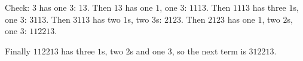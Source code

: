 Check: $3$ has one $3$: $13$. Then $13$ has one $1$, one $3$: $1113$. Then $1113$ has three $1$s, one $3$: $3113$. Then $3113$ has two $1$s, two $3$s: $2123$. Then $2123$ has one $1$, two $2$s, one $3$: $112213$.

Finally $112213$ has three $1$s, two $2$s and one $3$, so the next term is $\boxed{312213}$.
